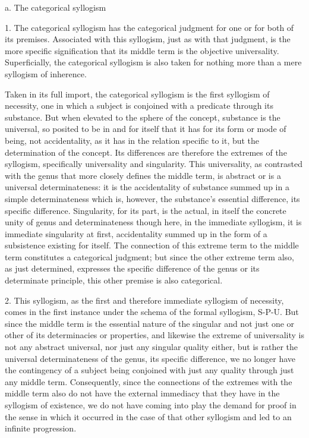 a. The categorical syllogism

1. The categorical syllogism has
the categorical judgment
for one or for both of its premises.
Associated with this syllogism,
just as with that judgment,
is the more specific signification
that its middle term is
the objective universality.
Superficially, the categorical syllogism is
also taken for nothing more than
a mere syllogism of inherence.

Taken in its full import,
the categorical syllogism is
the first syllogism of necessity,
one in which a subject is
conjoined with a predicate
through its substance.
But when elevated to
the sphere of the concept,
substance is the universal,
so posited to be in and for itself
that it has for its form
or mode of being, not accidentality,
as it has in the relation specific to it,
but the determination of the concept.
Its differences are therefore
the extremes of the syllogism,
specifically universality and singularity.
This universality, as contrasted with the genus
that more closely defines the middle term,
is abstract or is a universal determinateness:
it is the accidentality of substance
summed up in a simple determinateness
which is, however, the substance's
essential difference, its specific difference.
Singularity, for its part, is the actual,
in itself the concrete unity of genus and determinateness
though here, in the immediate syllogism,
it is immediate singularity at first,
accidentality summed up in the form of
a subsistence existing for itself.
The connection of this extreme term to
the middle term constitutes a categorical judgment;
but since the other extreme term also, as just determined,
expresses the specific difference of the genus
or its determinate principle,
this other premise is also categorical.

2. This syllogism, as the first and
therefore immediate syllogism of necessity,
comes in the first instance under
the schema of the formal syllogism, S-P-U.
But since the middle term is
the essential nature of the singular
and not just one or other of its determinacies or properties,
and likewise the extreme of universality is
not any abstract universal,
nor just any singular quality either,
but is rather the universal determinateness of the genus,
its specific difference,
we no longer have the contingency of a subject
being conjoined with just any quality
through just any middle term.
Consequently, since
the connections of the extremes with the middle term
also do not have the external immediacy
that they have in the syllogism of existence,
we do not have coming into play
the demand for proof in the sense in which
it occurred in the case of that other syllogism
and led to an infinite progression.

